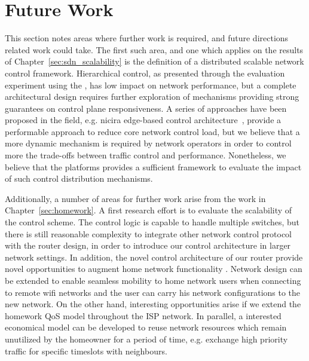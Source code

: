 \section{Future Work}
  
This section notes areas where further work is required, and future directions
related work could take. The first such area, and one which applies on the
results of Chapter~\ref{sec:sdn_scalability} is the definition of a distributed
scalable network control framework. Hierarchical control, as presented through
the evaluation experiment using the \sdnsim, has low impact on network
performance, but a complete architectural design requires further exploration of
mechanisms providing strong guarantees on control plane responsiveness. A series
of approaches have been proposed in the field, e.g. nicira edge-based control
architecture~\cite{koponen12}, provide a performable approach to reduce core
network control load, but we believe that a more dynamic mechanism is required
by network operators in order to control more the trade-offs between traffic
control and performance. Nonetheless, we believe that the \sdnsim platforms
provides a sufficient framework to evaluate the impact of such control
distribution mechanisms.

Additionally, a number of areas for further work arise from the work in
Chapter~\ref{sec:homework}. A first research effort is to evaluate the
scalability of the control scheme. The control logic is capable to handle
multiple switches, but there is still reasonable complexity to integrate other
network control protocol with the router design, in order to introduce
our control architecture in larger network settings. In addition, the novel control
architecture of our router provide novel opportunities to augment home network
functionality . Network design can be extended to enable seamless mobility to
home network users when connecting to remote wifi networks and the user can
carry his network configurations to the new network. On the other hand,
interesting opportunities arise if we extend the homework QoS model throughout the ISP
network. In parallel, a interested economical model can be developed to reuse
network resources  which remain unutilized by the homeowner for a period of
time, e.g. exchange high priority traffic for specific timeslots with
neighbours. 

